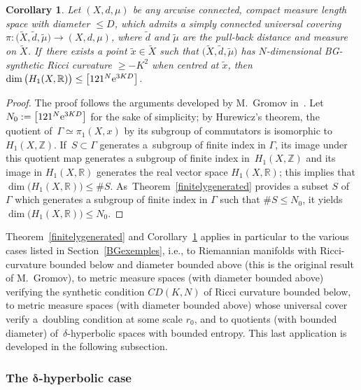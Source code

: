 \documentclass[10pt,a4paper]{amsart}
\numberwithin{equation}{section}
\newtheorem{Corollary}[theor]{Corollary}
\newcommand{\Z}{\mathbb{Z}}
\newcommand{\R}{\mathbb{R}}
\newcommand{\f}{\rightarrow}
\begin{document}
\begin{Corollary}\label{Bettinumbers0}
Let $(X,d, \mu)$ be any arcwise connected, compact measure length space with diameter $\le D$, which admits a simply connected
universal covering
$ \pi\colon \big(\widetilde X, \tilde d, \tilde \mu\big) \f (X, d, \mu)$, where $\tilde d $ and $\tilde \mu$ are the pull-back distance and measure on $\widetilde X$. If~there exists a point $\tilde x \in \widetilde X$ such that
$\big(\widetilde X, \tilde d, \tilde \mu\big)$ has $N$-dimensional BG-synthetic Ricci curvature $\ge -K^2$ when centred at $\tilde x$, then
$\dim \big( H_1 (X, \R) \big) \le \big[121^N {\rm e}^{3 K D}\big]$.
\end{Corollary}

\begin{proof}
The proof follows the arguments developed by M.~Gromov in~\cite[Section~5.20]{Gr1}. Let $N_0 := \big[121^N {\rm e}^{3 K D}\big]$
for the sake of simplicity; by Hurewicz's theorem, the quotient of~$\Gamma \simeq \pi_1 (X,x)$ by its subgroup of commutators is isomorphic to $H_1 (X, \Z)$. If~$S \subset \Gamma$ generates a~subgroup
of finite index in $\Gamma $, its image under this quotient map generates a subgroup of finite index in~$H_1 (X, \Z)$ and its image in $H_1 (X, \R)$ generates
the real vector space $H_1 (X, \R)$; this implies that $\dim \big( H_1 (X, \R) \big) \le \# S$. As~Theorem~\ref{finitelygenerated}
provides
a subset $S$ of~$\Gamma$ which generates a subgroup of finite index in $\Gamma $ such that $\# S \le N_0$, it yields $\dim \big( H_1 (X, \R) \big)
\le N_0$.
\end{proof}

Theorem~\ref{finitelygenerated} and Corollary~\ref{Bettinumbers0} applies
in particular to the various cases listed in Section~\ref{BGexemples}, i.e., to Riemannian manifolds
with Ricci-curvature bounded below and diameter bounded above (this is the original result of M.~Gromov), to metric measure spaces (with dia\-me\-ter bounded above) verifying the synthetic condition $CD (K, N)$ of Ricci curvature bounded below, to metric measure spaces (with diameter bounded above) whose universal cover verify a~doubling condition at some scale $r_0$, and to quotients (with bounded diameter) of~$\delta$-hyperbolic spaces
with bounded
entropy. This last application is developed in the following subsection.

\subsubsection[The delta-hyperbolic case]
{The $\boldsymbol\delta$-hyperbolic case}\label{hypcase}
\end{document}
